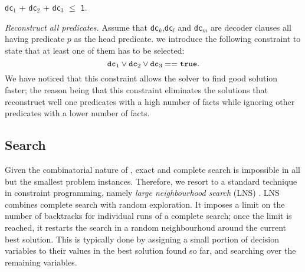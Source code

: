 \begin{center}
	\texttt{dc}$_1$ + \texttt{dc}$_2$ + \texttt{dc}$_3$ $\leq$ \texttt{1}.
\end{center}






%




\textit{Reconstruct all predicates.}
Assume that \texttt{dc}$_k$,\texttt{dc}$_l$ and \texttt{dc}$_m$ are decoder clauses all having predicate $p$ as the head predicate.
we introduce the following constraint to state that at least one of them has to be selected: %
$$ \text{\texttt{dc}}_1 \vee \text{\texttt{dc}}_2 \vee \text{\texttt{dc}}_3 == \text{\texttt{true}}.$$
We have noticed that this constraint allows the solver to find good solution faster; the reason being that this constraint eliminates the solutions that reconstruct well one predicates with a high number of facts while ignoring other predicates with a lower number of facts. 



\subsection{Search}

Given the combinatorial nature of , exact and complete search is impossible in all but the smallest problem instances.
Therefore, we resort to a standard technique in constraint programming, namely \textit{large neighbourhood search} (LNS) \cite{Ahuja:2002:SVL:772382.772385}. LNS combines complete search with random exploration.
It imposes a limit on the number of backtracks for individual runs of a complete search; once the limit is reached, it restarts the search in a random neighbourhoud around the current best solution. %
This is typically done by assigning a small portion of decision variables to their values in the best solution found so far, and searching over the remaining variables.

